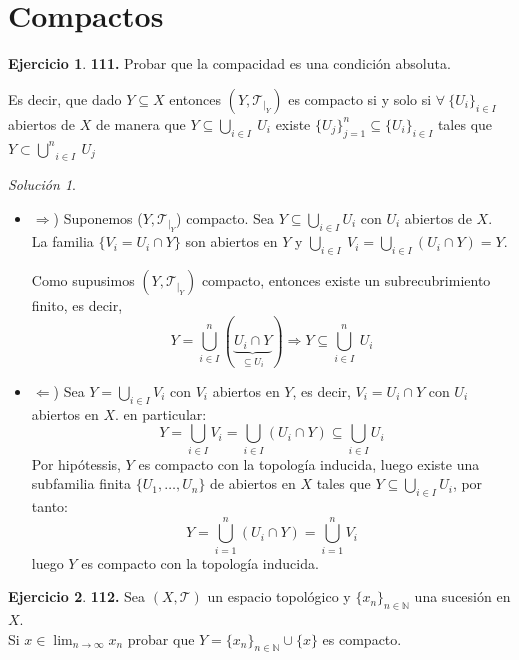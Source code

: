 \documentclass[12pt,twoside]{report}
\newcommand\mc[1]{\mathcal{#1}}
\theoremstyle{azul}
\theoremstyle{azul2}
\theoremstyle{plain}
\theoremstyle{definition}
\newtheorem*{ejer}{Ejercicio}
\theoremstyle{remark}
\newtheorem*{sol}{Solución}
\begin{document}
\section{Compactos}
\begin{ejer}
    \textbf{111.} Probar que la compacidad es una condición absoluta.

    Es decir, que dado $Y \subseteq X$ entonces $(Y, \mc{T}_{|_Y})$ es compacto si y solo si $\forall \: \{U_i\}_{i \in I}$ abiertos de $X$ de manera que $Y \subseteq \underset{i \in I}{\bigcup}\: U_i$ existe $\{U_j\}_{j=1}^n \subseteq \{U_i\}_{i \in I}$ tales que $Y \subset \underset{i \in I}{\overset{n}{\bigcup}}\: U_j$
\end{ejer}
\begin{sol}\:\vspace{-5mm}
\begin{itemize}
    \item$\Rightarrow$) Suponemos ($Y,\mc{T}_{|_Y}$) compacto. Sea $Y \subseteq \underset{i \in I}{\bigcup} U_i$ con $U_i$ abiertos de $X$. La familia $\{V_i=U_i \cap Y\}$ son abiertos en $Y$ y $\underset{i \in I}{\bigcup} \: V_i=\underset{i \in I}{\bigcup}(U_i \cap Y)=Y$. 

Como supusimos $(Y, \mc{T}_{|_Y})$ compacto, entonces existe un subrecubrimiento finito, es decir, 
$$Y=\bigcup_{i \in I}^n (\underbrace{U_i \cap Y}_{\subseteq U_i}) \Rightarrow Y \subseteq \bigcup_{i \in I}^n \: U_i$$

\item $\Leftarrow$) Sea $Y=\underset{i\in I}{\bigcup}V_i$ con $V_i$ abiertos en $Y$, es decir, $V_i=U_i\cap Y$ con $U_i$ abiertos en $X$. en particular:
$$Y=\underset{i\in I}{\bigcup}V_i=\underset{i\in I}{\bigcup}(U_i\cap Y)\subseteq \underset{i\in I}{\bigcup}U_i$$
Por hipótessis, $Y$ es compacto con la topología inducida, luego existe una subfamilia finita $\{U_1,\ldots, U_n\}$ de abiertos en $X$ tales que $Y\subseteq\underset{i\in I}{\bigcup}U_i$, por tanto:
$$Y=\bigcup_{i=1}^n (U_i \cap Y)=\bigcup_{i=1}^n V_i$$
luego $Y$ es compacto con la topología inducida.
\end{itemize}
\end{sol}
\begin{ejer}
    \textbf{112.} Sea $(X,\mc{T})$ un espacio topológico y $\{x_n\}_{n \in \mathbb{N}}$ una sucesión en $X$. 
    \\ Si $\displaystyle x \in \lim_{n \to \infty} x_n$ probar que $Y=\{x_n\}_{n \in \mathbb{N}} \cup \{x\}$ es compacto.
\end{ejer}
\end{document}
